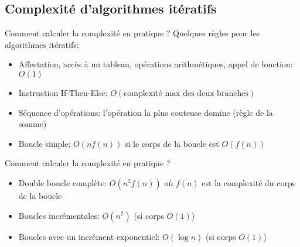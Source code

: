 \subsection{Complexité d'algorithmes itératifs}

\begin{frame}{Comment calculer la complexité en pratique ?}
Quelques règles pour les algorithmes itératifs:
\begin{itemize}
\item Affectation, accès à un tableau, opérations arithmétiques, appel de fonction: $O(1)$
\item Instruction If-Then-Else: $O(\mbox{complexité max des deux branches})$
\item Séquence d'opérations: l'opération la plus couteuse domine (règle de la somme)
\item Boucle simple: $O(n f(n))$ si le corps de la boucle est $O(f(n))$
\end{itemize}
\end{frame}

\begin{frame}{Comment calculer la complexité en pratique ?}
\begin{itemize}
\item Double boucle complète: $O(n^2 f(n))$ où $f(n)$ est la complexité du corps de la boucle
\item Boucles incrémentales: $O(n^2)$ (si corps $O(1)$)
\begin{center}\footnotesize
\end{center}
\item Boucles avec un incrément exponentiel: $O(\log n)$ (si corps $O(1)$)
\begin{center}\footnotesize
\end{center}
\end{itemize}
\end{frame}

